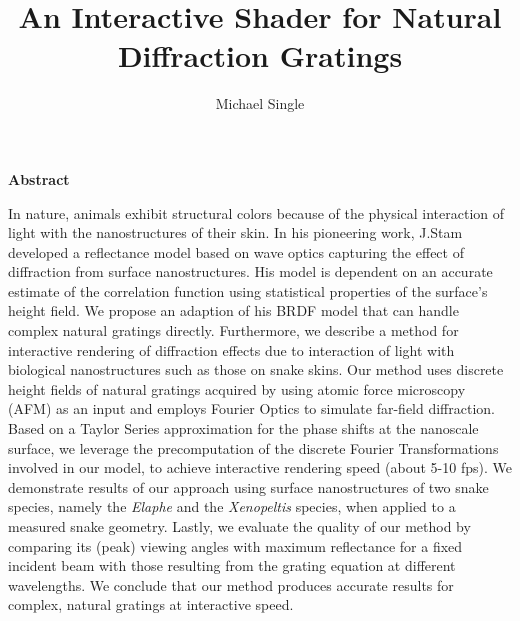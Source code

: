 \documentclass[a4paper]{report}
\begin{document}
\pagestyle{fancyplain} \thispagestyle{empty}

\title{An Interactive Shader for Natural Diffraction Gratings}
\author{Michael Single}

 \setcounter{page}{1}
\maketitle

\newpage
\thispagestyle{empty}
\vspace{8cm}
\noindent
{\centerline {\bf \large Abstract}}
\vspace{1cm}


\noindent
In nature, animals exhibit structural colors because of the physical interaction of light with the nanostructures of their skin. In his pioneering work, J.Stam developed a reflectance model based on wave optics capturing the effect of diffraction from surface nanostructures. His model is dependent on an accurate estimate of the correlation function using statistical properties of the surface's height field. We propose an adaption of his BRDF model that can handle complex natural gratings directly. Furthermore, we describe a method for interactive rendering of diffraction effects due to interaction of light with biological nanostructures such as those on snake skins. Our method uses discrete height fields of natural gratings acquired by using atomic force microscopy (AFM) as an input and employs Fourier Optics to simulate far-field diffraction. Based on a Taylor Series approximation for the phase shifts at the nanoscale surface, we leverage the precomputation of the discrete Fourier Transformations involved in our model, to achieve interactive rendering speed (about 5-10 fps). We demonstrate results of our approach using surface nanostructures of two snake species, namely the \emph{Elaphe} and the \emph{Xenopeltis} species, when applied to a measured snake geometry. Lastly, we evaluate the quality of our method by comparing its (peak) viewing angles with maximum reflectance for a fixed incident beam with those resulting from the grating equation at different wavelengths. We conclude that our method produces accurate results for complex, natural gratings at interactive speed.

 \setcounter{page}{1}
\tableofcontents

\newpage{\pagestyle{empty} \cleardoublepage}
\end{document}
